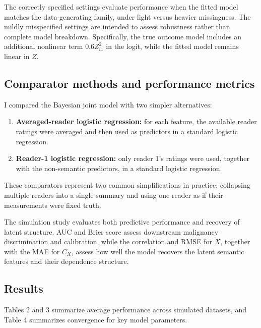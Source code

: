 \documentclass[twoside,11pt]{article}
\begin{document}
The correctly specified settings evaluate performance when the fitted model matches the data-generating family, under light versus heavier missingness. The mildly misspecified settings are intended to assess robustness rather than complete model breakdown. Specifically, the true outcome model includes an additional nonlinear term $0.6Z_{i1}^2$ in the logit, while the fitted model remains linear in $Z$.

\subsection{Comparator methods and performance metrics}

I compared the Bayesian joint model with two simpler alternatives:

\begin{enumerate}
\item \textbf{Averaged-reader logistic regression:} for each feature, the available reader ratings were averaged and then used as predictors in a standard logistic regression.
\item \textbf{Reader-1 logistic regression:} only reader 1's ratings were used, together with the non-semantic predictors, in a standard logistic regression.
\end{enumerate}

These comparators represent two common simplifications in practice: collapsing multiple readers into a single summary and using one reader as if their measurements were fixed truth.

The simulation study evaluates both predictive performance and recovery of latent structure. AUC and Brier score assess downstream malignancy discrimination and calibration, while the correlation and RMSE for $X$, together with the MAE for $C_X$, assess how well the model recovers the latent semantic features and their dependence structure.

\subsection{Results}

Tables 2 and 3 summarize average performance across simulated datasets, and Table 4 summarizes convergence for key model parameters.
\end{document}
